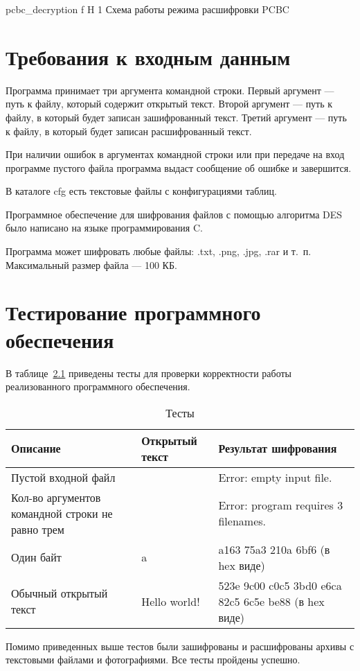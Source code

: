 \documentclass{bmstu}
\begin{document}
    {pcbc_decryption}
    {f}
    {H}
    {1\textwidth}
    {Схема работы режима расшифровки PCBC~\cite{wiki-pcbc}}

\chapter{Требования к входным данным}

Программа принимает три аргумента командной строки. 
Первый аргумент --- путь к файлу, который содержит открытый текст.
Второй аргумент --- путь к файлу, в который будет записан зашифрованный текст. 
Третий аргумент --- путь к файлу, в который будет записан расшифрованный текст.

При наличии ошибок в аргументах командной строки или при передаче на вход программе пустого файла программа выдаст сообщение об ошибке и завершится.

В каталоге cfg есть текстовые файлы с конфигурациями таблиц.

Программное обеспечение для шифрования файлов с помощью алгоритма DES было написано на языке программирования C.

Программа может шифровать любые файлы: .txt, .png, .jpg, .rar и т.~п. 
Максимальный размер файла --- 100 КБ.

\chapter{Тестирование программного обеспечения}

В таблице~\ref{tabular:tests} приведены тесты для проверки корректности работы реализованного программного обеспечения.

\begin{table}[H]
\caption{Тесты}
\label{tabular:tests}
\begin{tabular}{|p{4cm}|p{5cm}|p{6cm}|}
\hline
\textbf{Описание} & \textbf{Открытый текст} & \textbf{Результат шифрования}
\tabularnewline
\hline
Пустой входной файл & & Error: empty input file.
\tabularnewline
\hline
Кол-во аргументов командной строки не равно трем & & Error: program requires 3 filenames.
\tabularnewline
\hline
Один байт & a & a163 75a3 210a 6bf6 (в hex виде)
\tabularnewline
\hline
Обычный открытый текст & Hello world! & 523e 9c00 c0c5 3bd0 e6ca 82c5 6c5e be88 (в hex виде)
\tabularnewline
\hline
\end{tabular}
\end{table}

Помимо приведенных выше тестов были зашифрованы и расшифрованы архивы с текстовыми файлами и фотографиями. 
Все тесты пройдены успешно.
\end{document}
